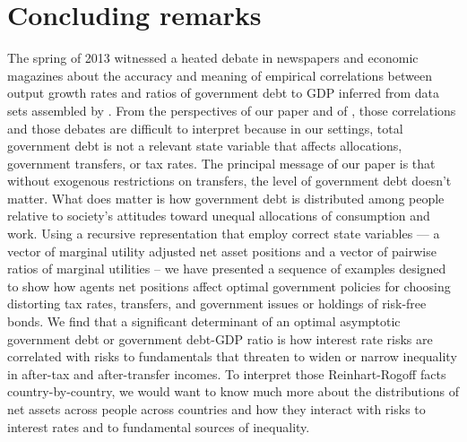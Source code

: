 \documentclass[thmsb,11pt]{article}
\begin{document}
\smallskip


\section{Concluding remarks\label{sec:conclude}}

  The spring of 2013 witnessed a heated debate in newspapers and economic magazines about the accuracy and meaning of empirical  correlations between output growth rates and
ratios of government debt to GDP inferred from data sets assembled by \cite{Reinhart2010}.
From the  perspectives of our paper and of  \cite{Wer07a}, those correlations and those debates are  difficult to interpret
because in our settings, total government debt is not a relevant state variable that affects allocations, government transfers, or tax rates.
The principal message of our paper  is that  without exogenous restrictions on transfers, the level of government debt doesn't matter. What
 does matter is how government  debt is distributed among people relative to society's attitudes toward unequal allocations of consumption and work.  Using a recursive representation that employ correct state variables --- a vector of marginal utility adjusted net asset positions and a vector of pairwise ratios of marginal utilities  --  we have
 presented  a sequence of examples designed to show how  agents net positions affect optimal government policies for choosing distorting tax
 rates, transfers, and government issues or holdings of risk-free bonds. We find that a significant determinant of an optimal asymptotic government
 debt or government debt-GDP ratio is how interest rate risks are correlated with risks to fundamentals that threaten to widen or narrow
 inequality in after-tax and after-transfer incomes. To interpret those Reinhart-Rogoff facts country-by-country, we would
 want to know much more about the distributions of net assets across people across countries  and how they interact with
 risks to interest rates and to fundamental sources of inequality.

\smallskip

\smallskip

\smallskip

\pagebreak
\end{document}
